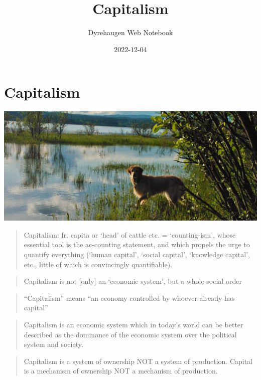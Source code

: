 \documentclass[
]{book}
\title{Capitalism}
\author{Dyrehaugen Web Notebook}
\date{2022-12-04}
\begin{document}
\maketitle

{
\setcounter{tocdepth}{1}
\tableofcontents
}
\hypertarget{capitalism}{%
\chapter{Capitalism}\label{capitalism}}

\includegraphics{fig/zelda.jpg}

\begin{quote}
Capitalism: fr. capita or `head' of cattle etc. = `counting-ism',
whose essential tool is the ac-counting statement,
and which propels the urge to quantify everything
(`human capital', `social capital', `knowledge capital', etc.,
little of which is convincingly quantifiable).
\end{quote}

\begin{quote}
Capitalism is not {[}only{]} an `economic system', but a whole social order
\end{quote}

\begin{quote}
``Capitalism'' means ``an economy controlled by whoever already has capital''
\end{quote}

\begin{quote}
Capitalism is an economic system which in today's world can be better described as the dominance of the economic system over the political system and society.
\end{quote}

\begin{quote}
Capitalism is a system of ownership NOT a system of production. Capital is a mechanism of ownership NOT a mechanism of production.
\end{quote}
\end{document}
